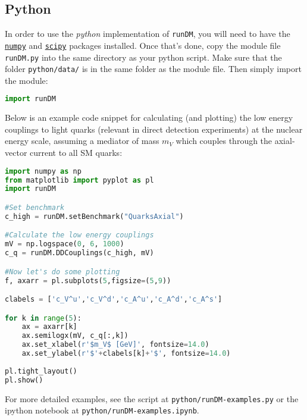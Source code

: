 \documentclass[notitlepage,12pt]{article}
\newcommand{\runDM}{\texttt{runDM}\xspace}
\begin{document}
\subsection{Python}

In order to use the \textit{python} implementation of \runDM, you will need to have the \href{http://www.numpy.org}{\texttt{numpy}} and \href{https://www.scipy.org/index.html}{\texttt{scipy}} packages installed.  Once that's done, copy the module file \texttt{runDM.py} into the same directory as your python script. Make sure that the folder \texttt{python/data/} is in the same folder as the module file. Then simply import the module:

\begin{lstlisting}[language=Python]
import runDM
\end{lstlisting}

Below is an example code snippet for calculating (and plotting) the low energy couplings to light quarks (relevant in direct detection experiments) at the nuclear energy scale, assuming a mediator of mass $m_V$ which couples through the axial-vector current to all SM quarks:

\begin{lstlisting}[language=Python]
import numpy as np
from matplotlib import pyplot as pl
import runDM

#Set benchmark
c_high = runDM.setBenchmark("QuarksAxial")

#Calculate the low energy couplings
mV = np.logspace(0, 6, 1000)
c_q = runDM.DDCouplings(c_high, mV)

#Now let's do some plotting
f, axarr = pl.subplots(5,figsize=(5,9))

clabels = ['c_V^u','c_V^d','c_A^u','c_A^d','c_A^s']

for k in range(5):
    ax = axarr[k]
    ax.semilogx(mV, c_q[:,k])
    ax.set_xlabel(r'$m_V$ [GeV]', fontsize=14.0)
    ax.set_ylabel(r'$'+clabels[k]+'$', fontsize=14.0)
    
pl.tight_layout()
pl.show()
\end{lstlisting}
For more detailed examples, see the script at \texttt{python/runDM-examples.py} or the ipython notebook at \texttt{python/runDM-examples.ipynb}.
\end{document}
